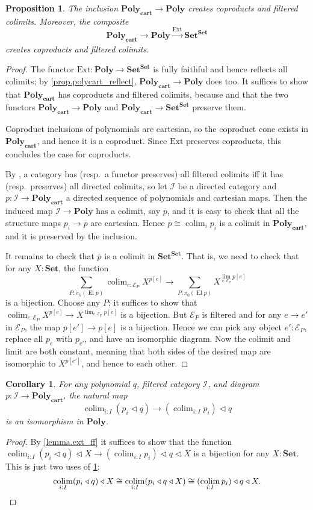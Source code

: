 \documentclass[11pt, one side, article]{memoir}
\theoremstyle{definition}
\theoremstyle{plain}
\newtheorem{proposition}[definitionx]{Proposition}
\newtheorem{corollary}[definitionx]{Corollary}
\DeclareMathOperator*{\colim}{colim}
\DeclareMathOperator{\el}{El}
\newcommand{\cat}[1]{\mathcal{#1}}%
\newcommand{\Cat}[1]{\mathbf{#1}}%
\newcommand{\fun}[1]{\mathrm{#1}}%
\newcommand{\too}{\longrightarrow}
\newcommand{\To}[2][]{\xrightarrow[#1]{#2}}
\newcommand{\ol}[1]{\overline{#1}}
\newcommand{\smset}{\Cat{Set}}
\newcommand{\poly}{\Cat{Poly}}
\newcommand{\polycart}{\poly_\Cat{cart}}
\newcommand{\tri}{\mathbin{\triangleleft}}
\newcommand{\ext}{\fun{Ext}}
\begin{document}
\begin{proposition}\label{prop.polycart_colimits}
The inclusion $\polycart\to\poly$ creates coproducts and filtered colimits. Moreover, the composite
\[
\polycart\to\poly\To{\ext}\smset^\smset
\]
creates coproducts and filtered colimits.
\end{proposition}
\begin{proof}
The functor $\ext\colon\poly\to\smset^\smset$ is fully faithful and hence reflects all colimits; by \cref{prop.polycart_reflect}, $\polycart\to\poly$ does too. It suffices to show that $\polycart$ has coproducts and filtered colimits, because and that the two functors $\polycart\to\poly$ and $\polycart\to\smset^\smset$ preserve them.

Coproduct inclusions of polynomials are cartesian, so the coproduct cone exists in $\polycart$, and hence it is a coproduct. Since $\ext$ preserves coproducts, this concludes the case for coproducts.

By \cite{Adamek.Rosicky:1994a}, a category has (resp.\ a functor preserves) all filtered colimits iff it has (resp.\ preserves) all directed colimits, so let $\cat{I}$ be a directed category and $p\colon\cat{I}\to\polycart$ a directed sequence of polynomials and cartesian maps. Then the induced map $\cat{I}\to\poly$ has a colimit, say $\ol{p}$, and it is easy to check that all the structure maps $p_i\to\ol{p}$ are cartesian. Hence $\ol{p}\cong\colim_ip_i$ is a colimit in $\polycart$, and it is preserved by the inclusion.

It remains to check that $\ol{p}$ is a colimit in $\smset^\smset$. That is, we need to check that for any $X:\smset$, the function
\[
\sum_{P:\pi_0(\el p)}\colim_{e:\cat{E}_P}X^{p[e]}\too
\sum_{P:\pi_0(\el p)}X^{\lim_{e:\cat{E}_P}p[e]}
\]
is a bijection. Choose any $P$; it suffices to show that $\colim_{e:\cat{E}_P} X^{p[e]}\to X^{\lim_{e:\cat{E}_P}p[e]}$ is a bijection. But $\cat{E}_P$ is filtered and for any $e\to e'$ in $\cat{E}_P$, the map $p[e']\to p[e]$ is a bijection. Hence we can pick any object $e':\cat{E}_P$, replace all $p_e$ with $p_{e'}$, and have an isomorphic diagram. Now the colimit and limit are both constant, meaning that both sides of the desired map are isomorphic to $X^{p[e']}$, and hence to each other.
\end{proof}

\begin{corollary}
For any polynomial $q$, filtered category $\cat{I}$, and diagram $p\colon\cat{I}\to\polycart$, the natural map
\[
\colim_{i:I}(p_i\tri q)\to(\colim_{i:I}p_i)\tri q
\]
is an isomorphism in $\poly$.
\end{corollary}
\begin{proof}
By \cref{lemma.ext_ff} it suffices to show that the function $\colim_{i:I}(p_i\tri q)\tri X\to(\colim_{i:I}p_i)\tri q\tri X$ is a bijection for any $X:\smset$. This is just two uses of \cref{prop.polycart_colimits}:
\[
\colim_{i:I}(p_i\tri q)\tri X\cong\colim_{i:I}(p_i\tri q\tri X)\cong(\colim_{i:I}p_i)\tri q\tri X.
\qedhere
\]
\end{proof}

\printbibliography
\end{document}
